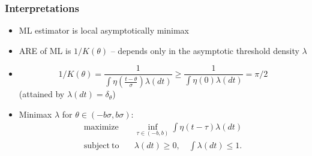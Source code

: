 \documentclass[mathserif]{beamer}
\begin{document}
\begin{frame}
\frametitle{Interpretations}
\begin{itemize}
\item ML estimator is local asymptotically minimax 
\item ARE of ML is $1/K(\theta)$ --  depends only in the asymptotic threshold density $\lambda$
\end{itemize}

\begin{itemize}
\item \[
1/K(\theta) = \frac{1}{\int \eta \left( \frac{t-\theta}{\sigma}\right) \lambda(dt)}
\geq \frac{1}{\int \eta \left(0\right) \lambda(dt)} = \pi / 2
\]
(attained by $\lambda(dt) = \delta_{\theta}$)
\item Minimax $\lambda$ for $\theta \in (-b\sigma,b\sigma)$:
\begin{align*}
\mathrm{maximize} \quad &  \inf_{\tau \in (-b,b)} \int \eta(t-\tau) \lambda(dt)
\\ \nonumber
\mathrm{subject~to} 
\quad & \lambda(dt)\geq 0,\quad \int \lambda(dt) \leq 1. 
\end{align*}
\end{itemize}

\end{frame}
\end{document}
